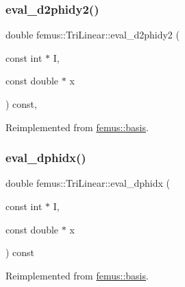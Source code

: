 \mbox{\label{classfemus_1_1_tri_linear_a39bc9cfe4f0c5d994730b3202abc53c6}} 
\subsubsection{\texorpdfstring{eval\+\_\+d2phidy2()}{eval\_d2phidy2()}}
{\footnotesize\ttfamily double femus\+::\+Tri\+Linear\+::eval\+\_\+d2phidy2 (\begin{DoxyParamCaption}\item[{const int $\ast$}]{I,  }\item[{const double $\ast$}]{x }\end{DoxyParamCaption}) const\hspace{0.3cm}{\ttfamily [inline]}, {\ttfamily [virtual]}}



Reimplemented from \mbox{\hyperlink{classfemus_1_1basis_a0febb29fe4b32213ff8d6d428f7241cd}{femus\+::basis}}.

\mbox{\label{classfemus_1_1_tri_linear_a2cec2770fa07f3f4175b02368e8e7d6a}} 
\subsubsection{\texorpdfstring{eval\+\_\+dphidx()}{eval\_dphidx()}}
{\footnotesize\ttfamily double femus\+::\+Tri\+Linear\+::eval\+\_\+dphidx (\begin{DoxyParamCaption}\item[{const int $\ast$}]{I,  }\item[{const double $\ast$}]{x }\end{DoxyParamCaption}) const\hspace{0.3cm}{\ttfamily [virtual]}}



Reimplemented from \mbox{\hyperlink{classfemus_1_1basis_a4db7d29cf8a753ddbccc4a297dafa0bf}{femus\+::basis}}.

\mbox{\label{classfemus_1_1_tri_linear_adca4bfeb974a52fe8b8dfc88561d0c4b}} 

